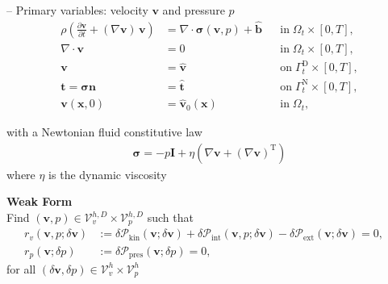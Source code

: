 \documentclass[a4paper,12pt]{report}
\newcommand{\Om}{\mathit{\Omega}}
\newcommand{\Gm}{\mathit{\Gamma}}
\begin{document}
-- Primary variables: velocity $\boldsymbol{v}$ and pressure $p$
\begin{equation}
\label{equation-fluid-strong-form}
\begin{aligned}
\rho\left(\frac{\partial\boldsymbol{v}}{\partial t} + (\nabla\boldsymbol{v})\,\boldsymbol{v}\right) &= \nabla \cdot \boldsymbol{\sigma}(\boldsymbol{v},p) + \hat{\boldsymbol{b}} &&\text{in} \; \mathit{\Om}_t \times [0, T], \\
\nabla\cdot \boldsymbol{v} &= 0 &&\text{in} \; \mathit{\Om}_t \times [0, T],\\
\boldsymbol{v} &= \hat{\boldsymbol{v}} &&\text{on} \; \mathit{\Gm}_t^{\mathrm{D}} \times [0, T],\\
\boldsymbol{t} = \boldsymbol{\sigma}\boldsymbol{n} &= \hat{\boldsymbol{t}} &&\text{on} \; \mathit{\Gm}_t^{\mathrm{N}} \times [0, T],\\
\boldsymbol{v}(\boldsymbol{x},0) &= \hat{\boldsymbol{v}}_{0}(\boldsymbol{x}) &&\text{in} \; \mathit{\Om}_t,
\end{aligned}
\end{equation}

with a Newtonian fluid constitutive law
\begin{align}
\boldsymbol{\sigma} = -p \boldsymbol{I} + \eta \left(\nabla \boldsymbol{v} + (\nabla \boldsymbol{v})^{\mathrm{T}}\right)
\end{align}
where $\eta$ is the dynamic viscosity

\textbf{Weak Form}\\
Find $(\boldsymbol{v},p) \in \boldsymbol{\mathcal{V}}_{v}^{h,D} \times \mathcal{V}_{p}^{h,D}$ such that
\begin{equation}
\label{equation-fluid-weak-form}
\begin{aligned}
r_v(\boldsymbol{v},p;\delta\boldsymbol{v}) &:= \delta \mathcal{P}_{\mathrm{kin}}(\boldsymbol{v};\delta\boldsymbol{v}) + \delta \mathcal{P}_{\mathrm{int}}(\boldsymbol{v},p;\delta\boldsymbol{v}) - \delta \mathcal{P}_{\mathrm{ext}}(\boldsymbol{v};\delta\boldsymbol{v}) = 0, \quad \\
r_p(\boldsymbol{v};\delta p) &:= \delta \mathcal{P}_{\mathrm{pres}}(\boldsymbol{v};\delta p) = 0,
\end{aligned}
\end{equation}
for all $(\delta\boldsymbol{v},\delta p) \in \boldsymbol{\mathcal{V}}_{v}^{h} \times \mathcal{V}_{p}^{h}$
\end{document}
